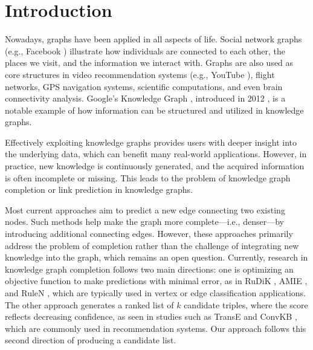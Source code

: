 \chapter{Introduction}
\label{chap:Introduction}

Nowadays, graphs have been applied in all aspects of life. Social network graphs (e.g., Facebook \cite{ugander2011anatomy}) illustrate how individuals are connected to each other, the places we visit, and the information we interact with. Graphs are also used as core structures in video recommendation systems (e.g., YouTube \cite{baluja2008video}), flight networks, GPS navigation systems, scientific computations, and even brain connectivity analysis. Google’s Knowledge Graph \cite{googlekg:2020}, introduced in 2012 \cite{ji2020survey}, is a notable example of how information can be structured and utilized in knowledge graphs.

Effectively exploiting knowledge graphs provides users with deeper insight into the underlying data, which can benefit many real-world applications. However, in practice, new knowledge is continuously generated, and the acquired information is often incomplete or missing. This leads to the problem of knowledge graph completion or link prediction in knowledge graphs.

Most current approaches aim to predict a new edge connecting two existing nodes. Such methods help make the graph more complete—i.e., denser—by introducing additional connecting edges. However, these approaches primarily address the problem of completion rather than the challenge of integrating new knowledge into the graph, which remains an open question. Currently, research in knowledge graph completion follows two main directions: one is optimizing an objective function to make predictions with minimal error, as in RuDiK \cite{ortona2018robust}, AMIE \cite{galarraga2015fast}, and RuleN \cite{meilicke2018fine}, which are typically used in vertex or edge classification applications. The other approach generates a ranked list of \(k\) candidate triples, where the score reflects decreasing confidence, as seen in studies such as TransE \cite{bordes2013translating} and ConvKB \cite{vu2019capsule}, which are commonly used in recommendation systems. Our approach follows this second direction of producing a candidate list.

